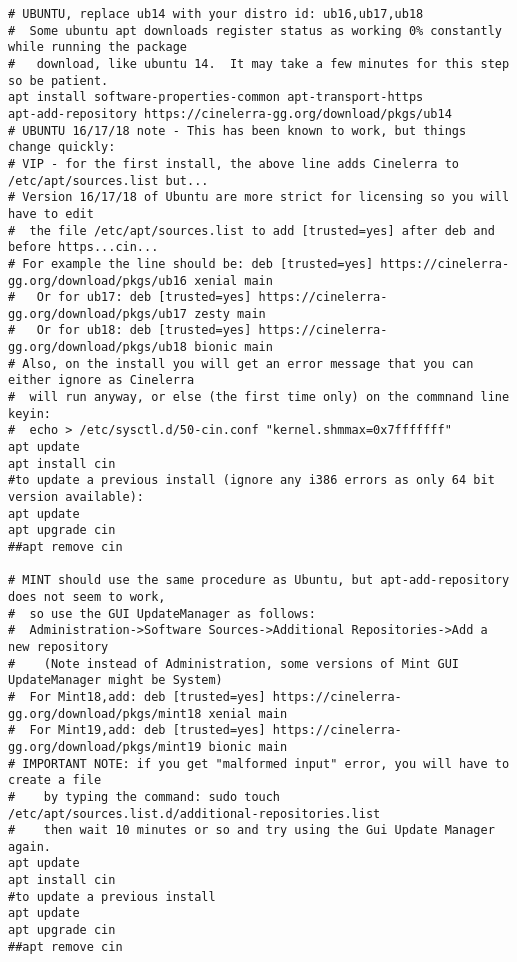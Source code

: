 \begin{lstlisting}[numbers=none]
# UBUNTU, replace ub14 with your distro id: ub16,ub17,ub18
#  Some ubuntu apt downloads register status as working 0% constantly while running the package
#   download, like ubuntu 14.  It may take a few minutes for this step so be patient.
apt install software-properties-common apt-transport-https
apt-add-repository https://cinelerra-gg.org/download/pkgs/ub14
# UBUNTU 16/17/18 note - This has been known to work, but things change quickly:
# VIP - for the first install, the above line adds Cinelerra to /etc/apt/sources.list but...
# Version 16/17/18 of Ubuntu are more strict for licensing so you will have to edit
#  the file /etc/apt/sources.list to add [trusted=yes] after deb and before https...cin...
# For example the line should be: deb [trusted=yes] https://cinelerra-gg.org/download/pkgs/ub16 xenial main
#   Or for ub17: deb [trusted=yes] https://cinelerra-gg.org/download/pkgs/ub17 zesty main
#   Or for ub18: deb [trusted=yes] https://cinelerra-gg.org/download/pkgs/ub18 bionic main
# Also, on the install you will get an error message that you can either ignore as Cinelerra
#  will run anyway, or else (the first time only) on the commnand line keyin: 
#  echo > /etc/sysctl.d/50-cin.conf "kernel.shmmax=0x7fffffff"
apt update
apt install cin
#to update a previous install (ignore any i386 errors as only 64 bit version available):
apt update
apt upgrade cin
##apt remove cin

# MINT should use the same procedure as Ubuntu, but apt-add-repository does not seem to work,
#  so use the GUI UpdateManager as follows:
#  Administration->Software Sources->Additional Repositories->Add a new repository
#    (Note instead of Administration, some versions of Mint GUI UpdateManager might be System)
#  For Mint18,add: deb [trusted=yes] https://cinelerra-gg.org/download/pkgs/mint18 xenial main
#  For Mint19,add: deb [trusted=yes] https://cinelerra-gg.org/download/pkgs/mint19 bionic main
# IMPORTANT NOTE: if you get "malformed input" error, you will have to create a file
#    by typing the command: sudo touch /etc/apt/sources.list.d/additional-repositories.list
#    then wait 10 minutes or so and try using the Gui Update Manager again.
apt update
apt install cin
#to update a previous install
apt update
apt upgrade cin
##apt remove cin


\end{lstlisting}
